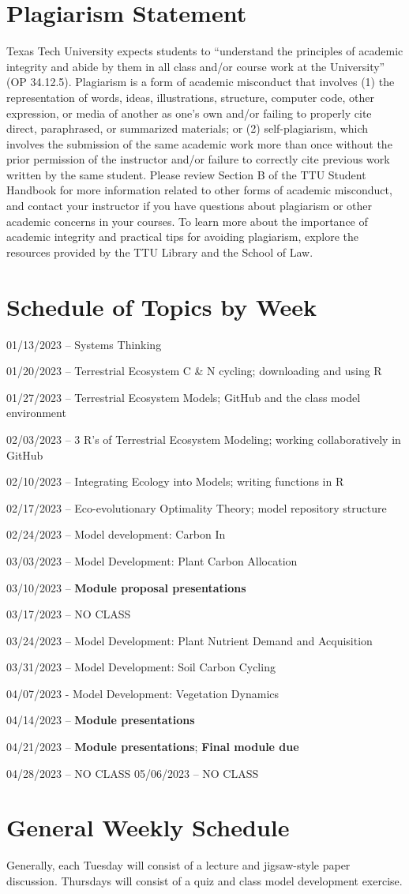 \documentclass[12pt, notitlepage]{article}   	%
\begin{document}
{\section{Plagiarism Statement}
Texas Tech University expects students to “understand the principles of academic integrity 
and abide by them in all class and/or course work at the University” (OP 34.12.5). 
Plagiarism is a form of academic misconduct that involves (1) the representation of words, 
ideas, illustrations, structure, computer code, other expression, or media of another as 
one's own and/or failing to properly cite direct, paraphrased, or summarized materials; 
or (2) self-plagiarism, which involves the submission of the same academic work more than 
once without the prior permission of the instructor and/or failure to correctly cite 
previous work written by the same student. Please review Section B of the TTU 
Student Handbook for more information related to other forms of academic misconduct, 
and contact your instructor if you have questions about plagiarism or other 
academic concerns in your courses. To learn more about the importance of 
academic integrity and practical tips for avoiding plagiarism, explore the 
resources provided by the TTU Library and the School of Law.

\newpage

\section*{Schedule of Topics by Week}
01/13/2023 – Systems Thinking \par
01/20/2023 – Terrestrial Ecosystem C & N cycling; downloading and using R \par
01/27/2023 – Terrestrial Ecosystem Models; GitHub and the class model environment \par
02/03/2023 – 3 R's of Terrestrial Ecosystem Modeling; working collaboratively in GitHub \par
02/10/2023 – Integrating Ecology into Models; writing functions in R \par
02/17/2023 – Eco-evolutionary Optimality Theory; model repository structure \par
02/24/2023 – Model development: Carbon In \par
03/03/2023 – Model Development: Plant Carbon Allocation \par
03/10/2023 – \textbf{Module proposal presentations} \par
03/17/2023 – NO CLASS \par
03/24/2023 – Model Development: Plant Nutrient Demand and Acquisition \par
03/31/2023 – Model Development: Soil Carbon Cycling \par
04/07/2023 - Model Development: Vegetation Dynamics \par
04/14/2023 – \textbf{Module presentations} \par
04/21/2023 – \textbf{Module presentations}; \textbf{Final module due} \par
04/28/2023 – NO CLASS
05/06/2023 – NO CLASS

\section*{General Weekly Schedule}
Generally, each Tuesday will consist of a lecture and jigsaw-style paper discussion. Thursdays
will consist of a quiz and class model development exercise.

} %
\end{document}
